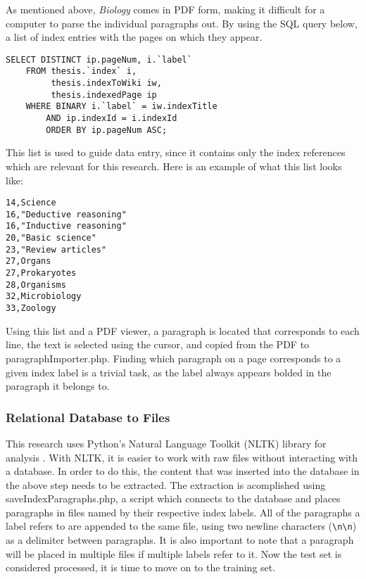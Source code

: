As mentioned above, {\it Biology} comes in PDF form, making it difficult for a computer to parse the individual paragraphs out.
By using the SQL query below, a list of index entries with the pages on which they appear.

\begin{lstlisting}
SELECT DISTINCT ip.pageNum, i.`label`
    FROM thesis.`index` i,
         thesis.indexToWiki iw,
         thesis.indexedPage ip
    WHERE BINARY i.`label` = iw.indexTitle
        AND ip.indexId = i.indexId
        ORDER BY ip.pageNum ASC;
\end{lstlisting}

This list is used to guide data entry, since it contains only the index references which are relevant for this research.
Here is an example of what this list looks like:

\begin{multicols}{2}
\begin{verbatim}
14,Science
16,"Deductive reasoning"
16,"Inductive reasoning"
20,"Basic science"
23,"Review articles"
27,Organs
27,Prokaryotes
28,Organisms
32,Microbiology
33,Zoology
\end{verbatim}
\end{multicols}

Using this list and a PDF viewer, a paragraph is located that corresponds to each line, the text is selected using the cursor, and copied from the PDF to paragraphImporter.php.
Finding which paragraph on a page corresponds to a given index label is a trivial task, as the label always appears bolded in the paragraph it belongs to.

\subsubsection{Relational Database to Files}
\label{subsubsec:RDB2F}

This research uses Python's Natural Language Toolkit (NLTK) library for analysis \cite{nltk}.
With NLTK, it is easier to work with raw files without interacting with a database.
In order to do this, the content that was inserted into the database in the above step needs to be extracted.
The extraction is acomplished using saveIndexParagraphs.php, a script which connects to the database and places paragraphs in files named by their respective index labels.
All of the paragraphs a label refers to are appended to the same file, using two newline characters ({\tt{\textbackslash}n{\textbackslash}n}) as a delimiter between paragraphs.
It is also important to note that a paragraph will be placed in multiple files if multiple labels refer to it.
Now the test set is considered processed, it is time to move on to the training set.

